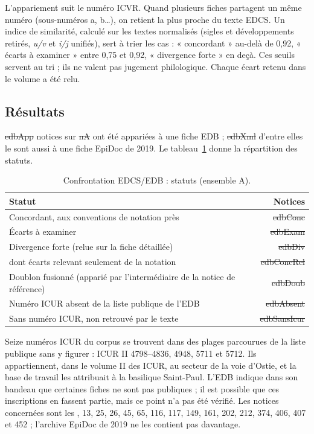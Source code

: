 L’appariement suit le numéro ICVR. Quand plusieurs fiches partagent un même numéro (sous-numéros a, b…), on retient la plus proche du texte EDCS. Un indice de similarité, calculé sur les textes normalisés (sigles et développements retirés, \emph{u/v} et \emph{i/j} unifiés), sert à trier les cas : « concordant » au-delà de 0,92, « écarts à examiner » entre 0,75 et 0,92, « divergence forte » en deçà. Ces seuils servent au tri ; ils ne valent pas jugement philologique. Chaque écart retenu dans le volume a été relu.

\subsection{Résultats}

\st{edbApp} notices sur \st{nA} ont été appariées à une fiche EDB ; \st{edbXml} d’entre elles le sont aussi à une fiche EpiDoc de 2019. Le tableau~\ref{tab:edbstatut} donne la répartition des statuts.

\begin{table}[tbp]\centering\small
\caption{Confrontation EDCS/EDB : statuts (ensemble A).}\label{tab:edbstatut}
\begin{tabular}{@{}l r@{}}\toprule Statut & Notices\\\midrule
Concordant, aux conventions de notation près & \st{edbConc}\\
Écarts à examiner & \st{edbExam}\\
Divergence forte (relue sur la fiche détaillée) & \st{edbDiv}\\
\quad dont écarts relevant seulement de la notation & \st{edbConcRel}\\
Doublon fusionné (apparié par l’intermédiaire de la notice de référence) & \st{edbDoub}\\
Numéro ICUR absent de la liste publique de l’EDB & \st{edbAbsent}\\
Sans numéro ICUR, non retrouvé par le texte & \st{edbSansIcur}\\\bottomrule
\end{tabular}
\end{table}

Seize numéros ICUR du corpus se trouvent dans des plages parcourues de la liste publique sans y figurer : ICUR II 4798–4836, 4948, 5711 et 5712. Ils appartiennent, dans le volume II des ICUR, au secteur de la voie d’Ostie, et la base de travail les attribuait à la basilique Saint-Paul. L’EDB indique dans son bandeau que certaines fiches ne sont pas publiques ; il est possible que ces inscriptions en fassent partie, mais ce point n’a pas été vérifié. Les notices concernées sont les , 13, 25, 26, 45, 65, 116, 117, 149, 161, 202, 212, 374, 406, 407 et 452 ; l’archive EpiDoc de 2019 ne les contient pas davantage.

